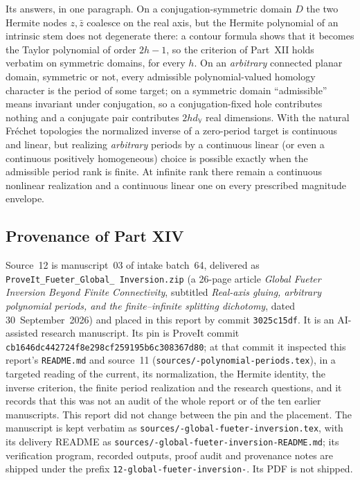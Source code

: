 \documentclass[11pt,a4paper]{article}
\numberwithin{equation}{section}
\theoremstyle{definition}
\theoremstyle{remark}
\theoremstyle{plain}
\newcommand{\VV}{\mathbb V}                       %
\newcommand{\dV}{d_{\VV}}                         %
\newcommand{\hy}{-\allowbreak}                 %
\begin{document}
Its answers, in one paragraph. On a conjugation-symmetric domain $D$ the two
Hermite nodes $z,\bar z$ coalesce on the real axis, but the Hermite polynomial
of an intrinsic stem does not degenerate there: a contour formula shows that it
becomes the Taylor polynomial of order $2h-1$, so the criterion of Part~XII
holds verbatim on symmetric domains, for every $h$. On an \emph{arbitrary}
connected planar domain, symmetric or not, every admissible polynomial-valued
homology character is the period of some target; on a symmetric domain
``admissible'' means invariant under conjugation, so a conjugation-fixed hole
contributes nothing and a conjugate pair contributes $2h\dV$ real dimensions.
With the natural Fr\'echet topologies the normalized inverse of a
zero-period target is continuous and linear, but realizing \emph{arbitrary}
periods by a continuous linear (or even a continuous positively homogeneous)
choice is possible exactly when the admissible period rank is finite. At
infinite rank there remain a continuous nonlinear realization and a
continuous linear one on every prescribed magnitude envelope.

\subsection{Provenance of Part XIV}
\label{h:sub:provenance}

Source~12 is manuscript~03 of intake batch~64, delivered as
\texttt{ProveIt\_\allowbreak Fueter\_\allowbreak Global\_\allowbreak
Inversion.zip} (a 26-page article \emph{Global Fueter Inversion Beyond Finite
Connectivity}, subtitled \emph{Real-axis gluing, arbitrary polynomial periods,
and the finite--infinite splitting dichotomy}, dated 30~September~2026) and
placed in this report by commit \texttt{3025c15df}. It is an AI-assisted
research manuscript. Its pin is ProveIt commit
\texttt{cb1646dc442724f8e298cf259195b6c308367d80}; at that commit it inspected
this report's \texttt{README.md} and source~11
(\texttt{sources/\hy polynomial\hy periods.tex}), in a targeted
reading of the current, its normalization, the Hermite identity, the inverse
criterion, the finite period realization and the research questions, and it
records that this was not an audit of the whole report or of the ten earlier
manuscripts. This report did not change between the pin and the placement.
The manuscript is kept verbatim as
\texttt{sources/\hy global\hy fueter\hy inversion.tex}, with its
delivery README as
\texttt{sources/\hy global\hy fueter\hy inversion\hy README.md};
its verification program, recorded outputs, proof audit and provenance notes
are shipped under the prefix \texttt{12\hy global\hy fueter\hy inversion\hy }.
Its PDF is not shipped.
\end{document}
